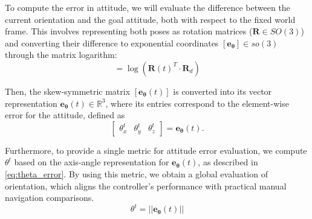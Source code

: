 To compute the error in attitude, we will evaluate the difference between the current orientation and the goal attitude, both with respect to the fixed world frame. This involves representing both poses as rotation matrices ($\bm{R}\in SO(3)$) and converting their difference to exponential coordinates $[\bm{{e_\theta}}]\in so(3)$ through the matrix logarithm:
\begin{equation}
     [\bm{{e_\theta}}(t)] = \log(\bm{R}(t)^T \cdot \bm{R}_d)
\end{equation}

Then, the skew-symmetric matrix $[\bm{{e_\theta}}(t)]$ is converted into its vector representation $\bm{{e_\theta}}(t) \in \mathbb{R}^3$, where its entries correspond to the element-wise error for the attitude, defined as
\begin{equation}
    \begin{bmatrix} \theta_{x}^t & \theta_{y}^t & \theta_{z}^t \end{bmatrix} = \bm{{e_\theta}}(t).
    \label{eq:attitude_error}
\end{equation}

Furthermore, to provide a single metric for attitude error evaluation, we compute $\theta^t$ based on the axis-angle representation for $\bm{{e_\theta}}(t)$, as described in \eqref{eq:theta_error}. By using this metric, we obtain a global evaluation of orientation, which aligns the controller's performance with practical manual navigation comparisons.
\begin{equation}
    \theta^t = ||\bm{{e_\theta}}(t)||
    \label{eq:theta_error}
\end{equation}
